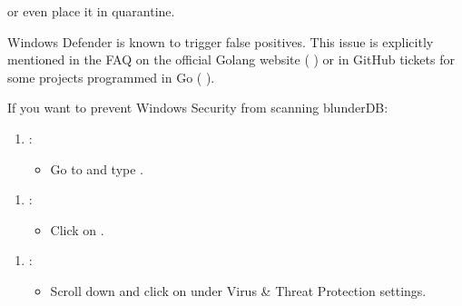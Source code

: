 \documentclass[letterpaper,10pt,english]{sphinxmanual}
\begin{document}
\sphinxAtStartPar
or even place it in quarantine.

\sphinxAtStartPar
Windows Defender is known to trigger false positives. This issue is explicitly mentioned in the FAQ on the official Golang website (  ) or in GitHub tickets for some projects programmed in Go (  ).

\sphinxAtStartPar
If you want to prevent Windows Security from scanning blunderDB:
\begin{enumerate}
%
\item {} 
\sphinxAtStartPar
{}:
\begin{itemize}
\item {} 
\sphinxAtStartPar
Go to  and type .

\end{itemize}

\end{enumerate}

\begin{figure}[htbp]
\centering

\noindent{}
\end{figure}
\begin{enumerate}
%
\setcounter{enumi}{1}
\item {} 
\sphinxAtStartPar
{}:
\begin{itemize}
\item {} 
\sphinxAtStartPar
Click on .

\end{itemize}

\end{enumerate}

\begin{figure}[htbp]
\centering

\noindent{}
\end{figure}
\begin{enumerate}
%
\setcounter{enumi}{2}
\item {} 
\sphinxAtStartPar
{}:
\begin{itemize}
\item {} 
\sphinxAtStartPar
Scroll down and click on  under Virus \& Threat Protection settings.

\end{itemize}

\end{enumerate}
\end{document}
